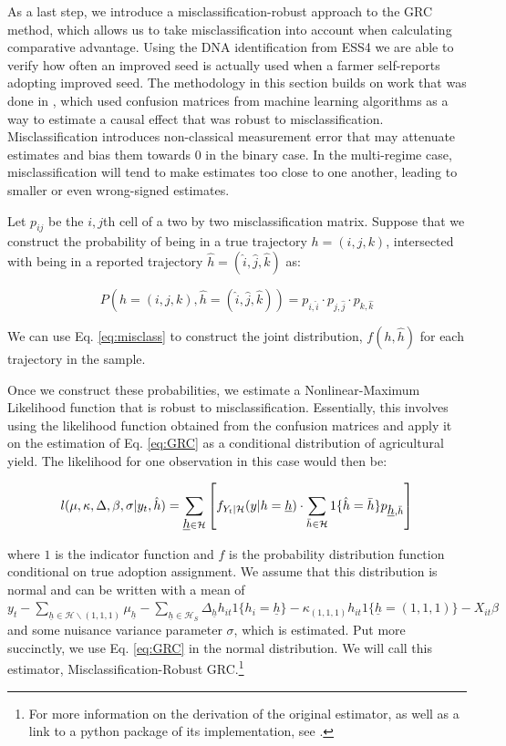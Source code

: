 \documentclass[11pt]{article}
\begin{document}
As a last step, we introduce a misclassification-robust approach to the GRC method, which allows us to take misclassification into account when calculating comparative advantage. Using the DNA identification from ESS4 we are able to verify how often an improved seed is actually used when a farmer self-reports adopting improved seed. The methodology in this section builds on work that was done in \cite{michuda2021three}, which used confusion matrices from machine learning algorithms as a way to estimate a causal effect that was robust to misclassification. Misclassification introduces non-classical measurement error that may attenuate estimates and bias them towards 0 in the binary case. In the multi-regime case, misclassification will tend to make estimates too close to one another, leading to smaller or even wrong-signed estimates.

Let $p_{ij}$ be the $i,j$th cell of a two by two misclassification matrix. Suppose that we construct the probability of being in a true trajectory $h = (i,j,k)$, intersected with being in a reported trajectory $\hat{h} = (\hat{i},\hat{j}, \hat{k})$ as:

\begin{equation}
\label{eq:misclass}
P(h = (i,j,k) , \hat{h} = (\hat{i},\hat{j}, \hat{k})) = p_{i, \hat{i}}\cdot p_{j, \hat{j}}\cdot p_{k, \hat{k}}
\end{equation}

We can use Eq. \ref{eq:misclass} to construct the joint distribution, $f(h, \hat{h})$ for each trajectory in the sample. 

Once we construct these probabilities, we estimate a Nonlinear-Maximum Likelihood function that is robust to misclassification. Essentially, this involves using the likelihood function obtained from the confusion matrices and apply it on the estimation of Eq. \ref{eq:GRC} as a conditional distribution of agricultural yield. The likelihood for one observation in this case would then be:

\begin{equation}
\label{eq:mr-grc}
l(\mu, \kappa, \Delta, \beta, \sigma|y_{t}, \hat{h}) = \sum_{\underbar{$h$}\in\mathcal{H}} \left[ f_{Y_{t}| \mathcal{H}}(y|h=\underbar{$h$})\cdot  \sum_{\bar{h} \in \mathcal{H}} 1\{\hat{h}=\bar{h}\} p_{\underbar{$h$}, \bar{h}} \right]
\end{equation}

\noindent where $1$ is the indicator function and $f$ is the probability distribution function conditional on true adoption assignment. We assume that this distribution is normal and can be written with a mean of $y_t - \sum_{\underline{h}\in\mathcal{H}\backslash (1,1,1)}\mu_{\underline{h}}-\sum_{\underline{h}\in\mathcal{H}_{S}}\Delta_{\underline{h}}h_{it}1\{h_{i}=\underline{h}\} - \kappa_{(1,1,1)}h_{it}1\{\underline{h}=(1,1,1)\}- X_{it}\beta$ and some nuisance variance parameter $\sigma$, which is estimated. Put more succinctly, we use Eq. \ref{eq:GRC} in the normal distribution. We will call this estimator, Misclassification-Robust GRC.\footnote{For more information on the derivation of the original estimator, as well as a link to a python package of its implementation, see \cite{michuda2021three}.}
\end{document}
